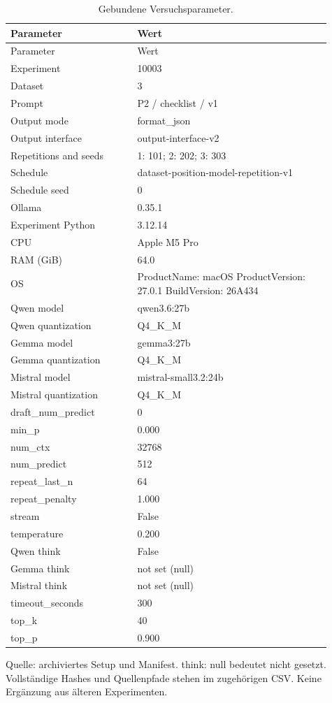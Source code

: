 \begingroup\small
\begin{longtable}{p{0.36\linewidth}p{0.55\linewidth}}
\caption{Gebundene Versuchsparameter.}\label{tab_v2_setup}\\
\toprule
Parameter & Wert \\
\midrule
\endfirsthead
\toprule
Parameter & Wert \\
\midrule
\endhead
Experiment & 10003 \\
Dataset & 3 \\
Prompt & P2 / checklist / v1 \\
Output mode & format\_json \\
Output interface & output-interface-v2 \\
Repetitions and seeds & 1: 101; 2: 202; 3: 303 \\
Schedule & dataset-position-model-repetition-v1 \\
Schedule seed & 0 \\
Ollama & 0.35.1 \\
Experiment Python & 3.12.14 \\
CPU & Apple M5 Pro \\
RAM (GiB) & 64.0 \\
OS & ProductName: macOS ProductVersion: 27.0.1 BuildVersion: 26A434 \\
Qwen model & qwen3.6:27b \\
Qwen quantization & Q4\_K\_M \\
Gemma model & gemma3:27b \\
Gemma quantization & Q4\_K\_M \\
Mistral model & mistral-small3.2:24b \\
Mistral quantization & Q4\_K\_M \\
draft\_num\_predict & 0 \\
min\_p & 0.000 \\
num\_ctx & 32768 \\
num\_predict & 512 \\
repeat\_last\_n & 64 \\
repeat\_penalty & 1.000 \\
stream & False \\
temperature & 0.200 \\
Qwen think & False \\
Gemma think & not set (null) \\
Mistral think & not set (null) \\
timeout\_seconds & 300 \\
top\_k & 40 \\
top\_p & 0.900 \\
\bottomrule
\end{longtable}
\par\smallskip\noindent
\begin{minipage}{\linewidth}\footnotesize Quelle: archiviertes Setup und Manifest. think: null bedeutet nicht gesetzt. Vollständige Hashes und Quellenpfade stehen im zugehörigen CSV. Keine Ergänzung aus älteren Experimenten.\end{minipage}
\endgroup
